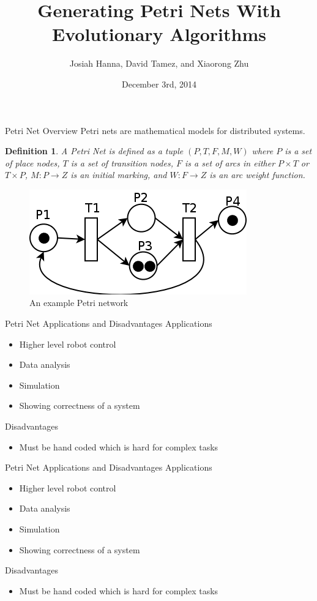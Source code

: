 \documentclass[12pt]{beamer}
\author{Josiah Hanna, David Tamez, and Xiaorong Zhu}
\title{Generating Petri Nets With Evolutionary Algorithms}
\institute{The University of Texas at Austin}
\date{December 3rd, 2014}
\newtheorem{myDef}{Definition}
\begin{document}
\begin{frame}
\titlepage
\end{frame}

\begin{frame}{Petri Net Overview}
Petri nets are mathematical models for distributed systems.
\begin{myDef}
A Petri Net is defined as a tuple $(P,T,F,M,W)$ where $P$ is a set of place nodes, $T$ is a set of transition nodes, $F$ is a set of arcs in either $P \times T$ or $T \times P$, $M: P \rightarrow Z$ is an initial marking, and $W: F \rightarrow Z$ is an arc weight function.
\end{myDef}
\begin{figure}
\includegraphics[scale=0.25]{petri_net.png}
\caption[]{An example Petri network \label{exampleNet}}
\end{figure}
\end{frame}

\begin{frame}{Petri Net Applications and Disadvantages}
Applications
\begin{itemize}
\item Higher level robot control
\item Data analysis
\item Simulation
\item Showing correctness of a system
\end{itemize}
Disadvantages
\begin{itemize}
\item Must be hand coded which is hard for complex tasks
\end{itemize}
\vspace{5ex}
\end{frame}
\begin{frame}{Petri Net Applications and Disadvantages}
Applications
\begin{itemize}
\item Higher level robot control
\item Data analysis
\item Simulation
\item Showing correctness of a system
\end{itemize}
Disadvantages
\begin{itemize}
\item Must be hand coded which is hard for complex tasks
\end{itemize}

\bigskip

\end{frame}
\end{document}
